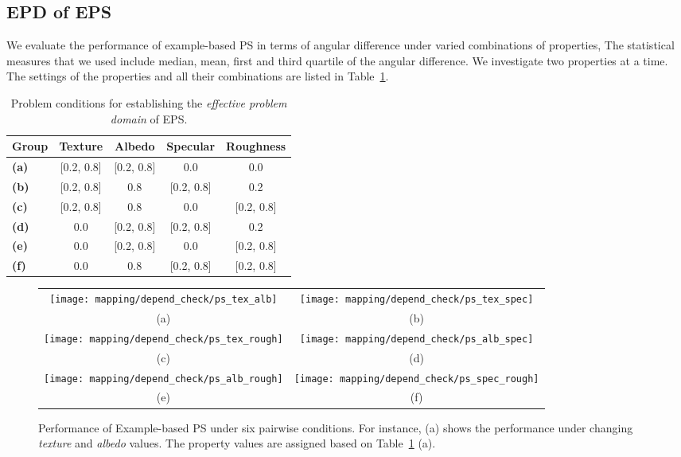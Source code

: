\subsection{EPD of EPS}
We evaluate the performance of example-based PS in terms of angular difference under varied combinations of properties, The statistical measures that we used include median, mean, first and third quartile of the angular difference. We investigate two properties at a time. The settings of the properties and all their combinations are listed in Table~\ref{tab:ps_depend_check_params}.

\begin{table}[!htbp]
  \centering
  \begin{tabular}{l*{4}{c}}
  \hline
  \textbf{Group} & Texture & Albedo & Specular & Roughness\\
  \hline
  \textbf{(a)} & [0.2, 0.8] & [0.2, 0.8] & 0.0 & 0.0\\
  \textbf{(b)} & [0.2, 0.8] & 0.8 & [0.2, 0.8] & 0.2\\
  \textbf{(c)} & [0.2, 0.8] & 0.8 & 0.0 & [0.2, 0.8]\\
  \textbf{(d)} & 0.0 & [0.2, 0.8] & [0.2, 0.8] & 0.2\\
  \textbf{(e)} & 0.0 & [0.2, 0.8] & 0.0 & [0.2, 0.8]\\
  \textbf{(f)} & 0.0 & 0.8 & [0.2, 0.8] & [0.2, 0.8]\\
  \hline
  \end{tabular}
  \caption{Problem conditions for establishing the \textit{effective problem domain} of EPS.}
  \label{tab:ps_depend_check_params}
\end{table}

\begin{figure}[!htbp]
\begin{tabular}{cc}
\texttt{[image: mapping/depend\_check/ps\_tex\_alb]}&
\texttt{[image: mapping/depend\_check/ps\_tex\_spec]}\\
(a) & (b)\\
\texttt{[image: mapping/depend\_check/ps\_tex\_rough]}&
\texttt{[image: mapping/depend\_check/ps\_alb\_spec]}\\
(c) & (d)\\
\texttt{[image: mapping/depend\_check/ps\_alb\_rough]}&
\texttt{[image: mapping/depend\_check/ps\_spec\_rough]}\\
(e) & (f)\\
\end{tabular}
\caption{Performance of Example-based PS under six pairwise conditions. For instance, (a) shows the performance under changing \textit{texture} and \textit{albedo} values. The property values are assigned based on Table~\ref{tab:ps_depend_check_params} (a).}
\label{fig:ps_depend_check}
\end{figure}

